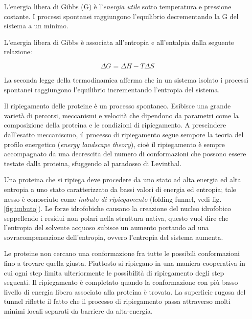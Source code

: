 {{\par L'energia libera di Gibbs (G) è l'\textit{energia utile} sotto temperatura e pressione costante. I processi spontanei raggiungono l'equilibrio decrementando la G del sistema a un minimo.

L'energia libera di Gibbs è associata all'entropia e all'entalpia dalla seguente relazione:

\[ \Delta G = \Delta H - T \Delta S \]

\par La seconda legge della termodinamica afferma che in un sistema isolato i processi spontanei raggiungono l'equilibrio incrementando l'entropia del sistema. 

\par Il ripiegamento delle proteine è un processo spontaneo. Esibisce una grande varietà di percorsi, meccanismi e velocità che dipendono da parametri come la composizione della proteina e le condizioni di ripiegamento. A prescindere dall'esatto meccaniscmo, il processo di ripiegamento segue sempore la teoria del profilo energetico (\textit{energy landscape theory}), cioè il ripiegamento è sempre accompagnato da una decrescita del numero di conformazioni che possono essere testate dalla proteina, sfuggendo al paradosso di Levinthal.

\par Una proteina che si ripiega deve procedere da uno stato ad alta energia ed alta entropia a uno stato caratterizzato da bassi valori di energia ed entropia;
tale nesso è conosciuto come \textit{imbuto di ripiegamento} (folding funnel, vedi fig. \ref{fig:imbuto}). Le forze idrofobiche causano la creazione del nucleo idrofobico seppellendo i residui non polari nella struttura nativa, questo vuol dire che l'entropia del solvente acquoso subisce un aumento portando ad una sovracompensazione dell'entropia, ovvero l'entropia del sistema aumenta.

\par Le proteine non cercano una conformazione fra tutte le possibili conformazioni fino a trovare quella giusta. Piuttosto si ripiegano in una maniera cooperativa in cui ogni step limita ulteriormente le possibilità di ripiegamento degli step seguenti. Il ripiegamento è completato quando la conformazione con più basso livello di energia libera associato alla proteina è trovata. La superficie rugosa del tunnel riflette il fatto che il processo di ripiegamento passa attraverso molti minimi locali separati da barriere da alta-energia.

}}
